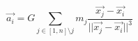\documentclass{article}
\begin{document}
\begin{equation*}
\vec{a_i} = G \sum_{j \in [1, n] \setminus j} m_j \frac{\vec{x_j} - \vec{x_i}}{||\vec{x_j} - \vec{x_i}||^3}
\end{equation*}
\end{document}

